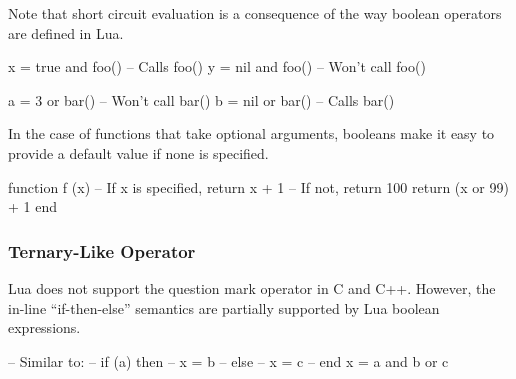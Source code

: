 \begin{SideBySideGrid}

	\UseLuaCodeBox{\LeftBoxA} \NextColumn \UseLuaCodeBox{\RightBoxA}

\LastRow
\end{SideBySideGrid}

Note that short circuit evaluation is a consequence of the way boolean
operators are defined in Lua.

\begin{lrbox}{\LeftBoxB}
\begin{NestedLuaCode}[linewidth=2.5in]
x = true and foo() -- Calls foo()
y = nil and foo()  -- Won't call foo()
\end{NestedLuaCode}
\end{lrbox}

\begin{lrbox}{\RightBoxB}
\begin{NestedLuaCode}[linewidth=2.5in]
a = 3 or bar()   -- Won't call bar()
b = nil or bar() -- Calls bar()
\end{NestedLuaCode}
\end{lrbox}

\begin{SideBySideGrid}

	\UseLuaCodeBox{\LeftBoxB} \NextColumn \UseLuaCodeBox{\RightBoxB}

\LastRow
\end{SideBySideGrid}

In the case of functions that take optional arguments, booleans make it easy to
provide a default value if none is specified.

\begin{LuaCode}
function f (x)
	-- If x is specified, return x + 1
	-- If not, return 100
	return (x or 99) + 1
end
\end{LuaCode}

\subsubsection{Ternary-Like Operator}

Lua does not support the question mark operator in C and C++.  However, the
in-line ``if-then-else'' semantics are partially supported by Lua boolean
expressions.

\begin{LuaCode}
-- Similar to:
--	if (a) then
--		x = b
--	else
--		x = c
--	end
x = a and b or c
\end{LuaCode}

